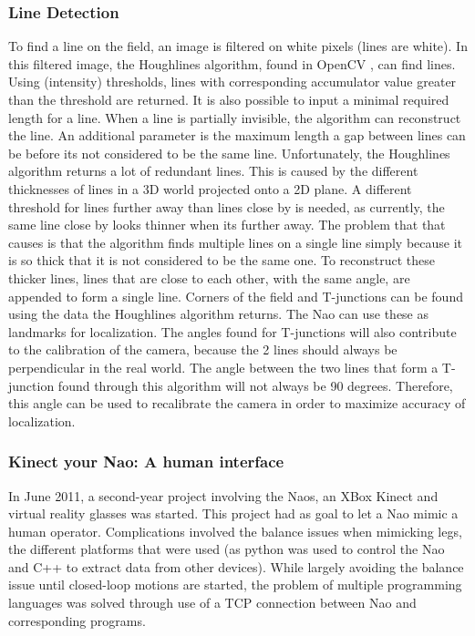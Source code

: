 \documentclass[11pt,a4paper,oneside]{article}
\begin{document}
\subsubsection{Line Detection}
To find a line on the field, an image is filtered on white pixels (lines are white). In this filtered image, the Houghlines algorithm, found in OpenCV \cite[p.~156]{Bradski2008}, can find lines. Using (intensity) thresholds, lines with corresponding accumulator value greater than the threshold are returned. It is also possible to input a minimal required length for a line. When a line is partially invisible, the algorithm can reconstruct the line. An additional parameter is the maximum length a gap between lines can be before its not considered to be the same line. 
Unfortunately, the Houghlines algorithm returns a lot of redundant lines. This is caused by the different thicknesses of lines in a 3D world projected onto a 2D plane. A different threshold for lines further away than lines close by is needed, as currently, the same line close by looks thinner when its further away. The problem that that causes is that the algorithm finds multiple lines on a single line simply because it is so thick that it is not considered to be the same one. To reconstruct these thicker lines, lines that are close to each other, with the same angle, are appended to form a single line. 
Corners of the field and T-junctions can be found using the data the Houghlines algorithm returns. The Nao can use these as landmarks for localization. The angles found for T-junctions will also contribute to the calibration of the camera, because the 2 lines should always be perpendicular in the real world. The angle between the two lines that form a T-junction found through this algorithm will not always be 90 degrees. Therefore, this angle can be used to recalibrate the camera in order to maximize accuracy of localization. 

\subsubsection{Kinect your Nao: A human interface}
In June 2011, a second-year project involving the Naos, an XBox Kinect and virtual reality glasses was started. This project had as goal to let a Nao mimic a human operator. Complications involved the balance issues when mimicking legs, the different platforms that were used (as python was used to control the Nao and C++ to extract data from other devices). While largely avoiding the balance issue until closed-loop motions are started, the problem of multiple programming languages was solved through use of a TCP connection between Nao and corresponding programs. 
\end{document}
